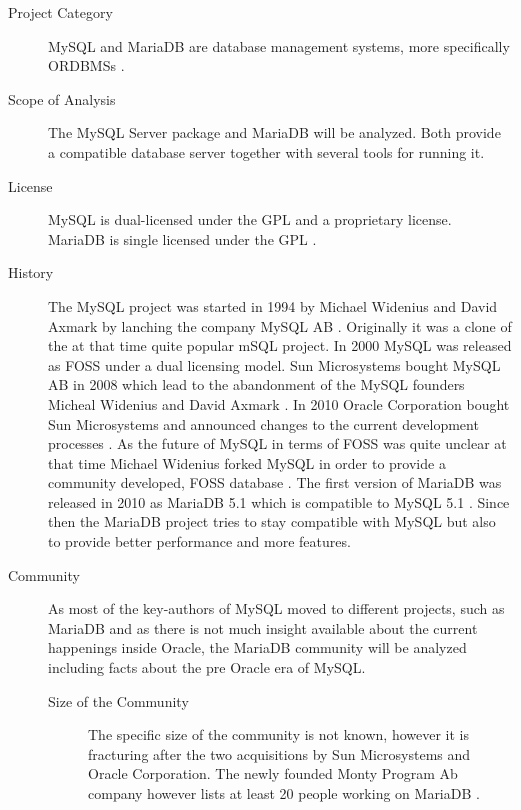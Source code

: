 \begin{description}

  \item[Project Category] MySQL and MariaDB are database management systems, more
    specifically \acp{ORDBMS} \cite{MySQLAbout}.

  \item[Scope of Analysis] The MySQL Server package and MariaDB will be
    analyzed. Both provide a compatible database server together with several
    tools for running it.

  \item[License] MySQL is dual-licensed under the \ac{GPL} and a proprietary
    license. MariaDB is single licensed under the \ac{GPL} \cite{MySQLLicense}.

  \item[History] The MySQL project was started in 1994 by Michael Widenius and
    David Axmark by lanching the company MySQL AB \cite{MySQLHistory}.
    Originally it was a clone of the at that time quite popular mSQL project.
    In 2000 MySQL was released as \ac{FOSS} under a dual licensing model. Sun
    Microsystems bought MySQL AB in 2008 which lead to the abandonment of the
    MySQL founders Micheal Widenius and David Axmark \cite{MySQLSun}. In 2010
    Oracle Corporation bought Sun Microsystems and announced changes to the
    current development processes \cite{MySQLOracle}. As the future of MySQL in
    terms of \ac{FOSS} was quite unclear at that time Michael Widenius forked
    MySQL in order to provide a community developed, \ac{FOSS} database
    \cite{MySQLBehind}. The first version of MariaDB was released in 2010 as
    MariaDB 5.1 which is compatible to MySQL 5.1 \cite{MySQLMariaDB5.1}. Since
    then the MariaDB project tries to stay compatible with MySQL but also to
    provide better performance and more features.

  \item[Community] As most of the key-authors of MySQL moved to different
    projects, such as MariaDB and as there is not much insight available about
    the current happenings inside Oracle, the MariaDB community will be
    analyzed including facts about the pre Oracle era of MySQL.

  \begin{description}

    \item[Size of the Community] The specific size of the community is not
      known, however it is fracturing after the two acquisitions by Sun
      Microsystems and Oracle Corporation. The newly founded Monty Program Ab
      company however lists at least 20 people working on MariaDB
      \cite{MySQLBehind}.


\end{description}
\end{description}
